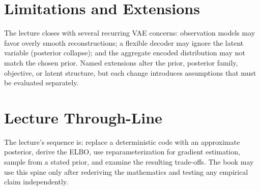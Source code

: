 \documentclass{article}
\begin{document}

\section{Limitations and Extensions}

The lecture closes with several recurring VAE concerns: observation models may favor
overly smooth reconstructions; a flexible decoder may ignore the latent variable
(posterior collapse); and the aggregate encoded distribution may not match the chosen
prior. Named extensions alter the prior, posterior family, objective, or latent
structure, but each change introduces assumptions that must be evaluated separately.

\section{Lecture Through-Line}

The lecture's sequence is: replace a deterministic code with an approximate posterior,
derive the ELBO, use reparameterization for gradient estimation, sample from a stated
prior, and examine the resulting trade-offs. The book may use this spine only after
rederiving the mathematics and testing any empirical claim independently.
\end{document}
